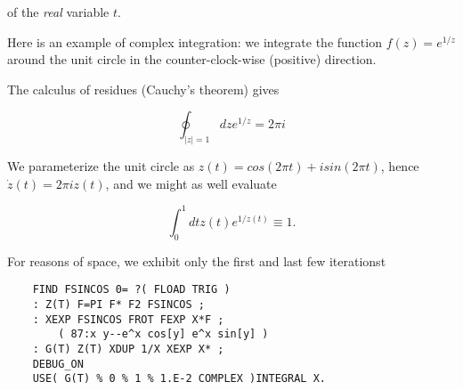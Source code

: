 of the \textit{real} variable $t$.

Here is an example of complex integration: we integrate the function $f(z) = e^{1/z}$ around the unit circle in the counter-clock-wise (positive) direction.

The calculus of residues (Cauchy's theorem) gives

\begin{equation}
\oint_{ \vert z \vert =1} dz e^{1/z} = 2\pi i
\end{equation}

We parameterize the unit circle as $z(t) = cos(2\pi t) + i sin(2\pi t)$, hence $\dot{z}(t) = 2\pi iz(t)$, and we might as well evaluate

\begin{equation}
\int_{0}^{1} dt z(t) e^{1/z(t)} \equiv 1.
\end{equation}

For reasons of space, we exhibit only the first and last few iterationst

\begin{lstlisting}
    FIND FSINCOS 0= ?( FLOAD TRIG )
    : Z(T) F=PI F* F2 FSINCOS ;
    : XEXP FSINCOS FROT FEXP X*F ;
        ( 87:x y--e^x cos[y] e^x sin[y] )
    : G(T) Z(T) XDUP 1/X XEXP X* ;
    DEBUG_ON
    USE( G(T) % 0 % 1 % 1.E-2 COMPLEX )INTEGRAL X.
\end{lstlisting}

